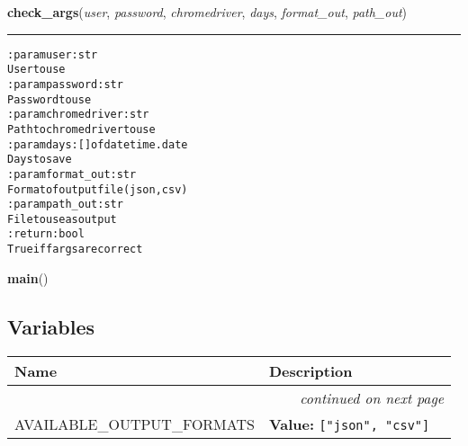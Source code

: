 \hspace{.8\funcindent}\begin{boxedminipage}{\funcwidth}

    \raggedright \textbf{check\_args}(\textit{user}, \textit{password}, \textit{chromedriver}, \textit{days}, \textit{format\_out}, \textit{path\_out})

    \vspace{-1.5ex}

    \rule{\textwidth}{0.5\fboxrule}
\setlength{\parskip}{2ex}
\begin{alltt}

:param user: str
    User to use
:param password: str
    Password to use
:param chromedriver: str
    Path to chromedriver to use
:param days: [] of datetime.date
    Days to save
:param format\_out: str
    Format of output file (json, csv)
:param path\_out: str
    File to use as output
:return: bool
    True iff args are correct
\end{alltt}

\setlength{\parskip}{1ex}
    \end{boxedminipage}

    \label{pygce:cli:main}

    \vspace{0.5ex}

\hspace{.8\funcindent}\begin{boxedminipage}{\funcwidth}

    \raggedright \textbf{main}()

\setlength{\parskip}{2ex}
\setlength{\parskip}{1ex}
    \end{boxedminipage}



  \subsection{Variables}

    \vspace{-1cm}
\hspace{\varindent}\begin{longtable}{|p{\varnamewidth}|p{\vardescrwidth}|l}
\cline{1-2}
\cline{1-2} \centering \textbf{Name} & \centering \textbf{Description}& \\
\cline{1-2}
\endhead\cline{1-2}\multicolumn{3}{r}{\small\textit{continued on next page}}\\\endfoot\cline{1-2}
\endlastfoot\raggedright A\-V\-A\-I\-L\-A\-B\-L\-E\-\_\-O\-U\-T\-P\-U\-T\-\_\-F\-O\-R\-M\-A\-T\-S\- & \raggedright \textbf{Value:} 
{\tt ["json", "csv"]}&\\
\cline{1-2}
\end{longtable}


